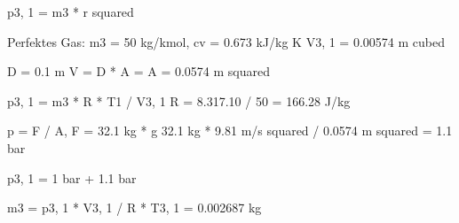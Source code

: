 p3, 1 = m3 * r squared

Perfektes Gas: m3 = 50 kg/kmol, cv = 0.673 kJ/kg K
V3, 1 = 0.00574 m cubed

D = 0.1 m
V = D * A = A = 0.0574 m squared

p3, 1 = m3 * R * T1 / V3, 1
R = 8.317.10 / 50 = 166.28 J/kg

p = F / A, F = 32.1 kg * g
32.1 kg * 9.81 m/s squared / 0.0574 m squared = 1.1 bar

p3, 1 = 1 bar + 1.1 bar

m3 = p3, 1 * V3, 1 / R * T3, 1 = 0.002687 kg